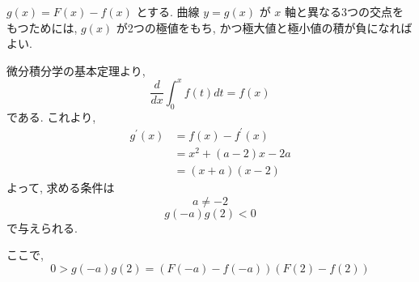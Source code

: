 \documentclass[a4j, 11pt]{jarticle}
\begin{document}
 
 $g(x) = F(x) - f(x)$ とする. 曲線 $y = g(x)$ が $x$ 軸と異なる3つの交点をもつためには,  
 $g(x)$ が2つの極値をもち, かつ極大値と極小値の積が負になればよい.  \par

微分積分学の基本定理より, 
 \begin{equation*}
  \frac{d}{dx}\int_{0}^{x} f(t) dt =  f(x)
 \end{equation*}
である. これより, 
 \begin{align*}
  g^{'}(x) &= f(x) - f^{'}(x)   \\
           &= x^2 + (a - 2)x - 2a \\
           &= (x + a)(x - 2)
 \end{align*}
よって, 求める条件は
 \begin{equation}
  a \neq -2
 \end{equation}
 \begin{equation}
  g(-a)g(2) < 0
 \end{equation}
で与えられる. 
\par
ここで, 
\begin{equation*}
0>g(-a)g(2)=(F(-a)-f(-a))(F(2)-f(2))
\end{equation*}


 
\end{document}
